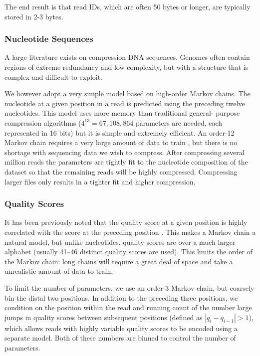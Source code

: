\documentclass[twocolumn]{article}
\begin{document}
The end result is that read IDs, which are often 50 bytes or longer, are
typically stored in 2-3 bytes.


\subsubsection{Nucleotide Sequences}

A large literature exists on compression DNA sequences. Genomes 
often contain regions of extreme redundancy and low complexity, but
with a structure that is complex and difficult to exploit.

We however adopt a very simple model based on high-order Markov chains. The
nucleotide at a given position in a read is predicted using the preceding
twelve nucleotides. This model uses more memory than traditional general-
purpose compression algorithms ($4^{13} = 67,108,864$ parameters are needed,
each represented in 16 bits)  but it is simple and extremely efficient. An
order-12 Markov chain requires a very large amount of data to train , but
there is no shortage with sequencing data we wish to compress. After
compressing several million reads the parameters are tightly fit to the
nucleotide composition of the dataset so that the remaining reads will be
highly compressed. Compressing larger files only results in a tighter fit and
higher compression.


\subsubsection{Quality Scores}

It has been previously noted that the quality score at a given position is
highly correlated with the score at the preceding position
\citep{Kozanitis2011}. This makes a Markov chain a natural model, but unlike
nucleotides, quality scores are over a much larger alphabet (usually 41--46
distinct quality scores are used). This limits the order of the Markov chain:
long chains will require a great deal of space and take a unrealistic amount
of data to train.

To limit the number of parameters, we use an order-3 Markov chain, but
coarsely bin the distal two positions. In addition to the preceding three
positions, we condition on the position within the read and running count of
the number large jumps in quality scores between subsequent positions (defined
as $|q_{i} - q_{i-1}| > 1$), which allows reads with highly variable quality
scores to be encoded using a separate model. Both of these numbers are binned
to control the number of parameters.
\end{document}
